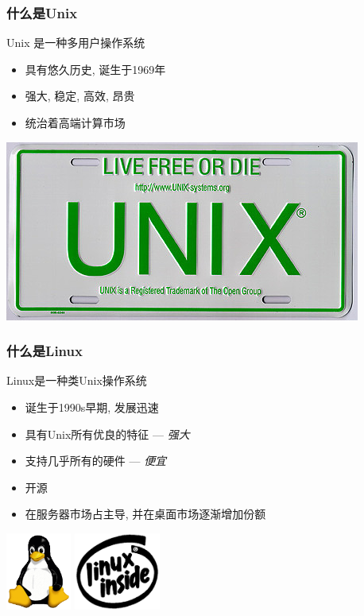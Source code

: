 \documentclass[compress]{beamer}
\begin{document}
\begin{frame}
\frametitle{什么是Unix}
\begin{block}{Unix 是一种多用户操作系统}
\begin{itemize}
    \item 具有悠久历史, 诞生于1969年
    \item 强大, 稳定, 高效, 昂贵
    \item 统治着高端计算市场
\end{itemize}
\end{block}
\begin{center}
 \centering\includegraphics[scale=0.7]{unix.jpg}
 \end{center}
\end{frame}

\begin{frame}
\frametitle{什么是Linux}
\begin{block}{Linux是一种类Unix操作系统}
\begin{itemize}
    \item 诞生于1990s早期, 发展迅速 
    \item 具有Unix所有优良的特征 --- \emph{强大}
    \item 支持几乎所有的硬件 --- \emph{便宜}
    \item 开源
    \item 在服务器市场占主导, 并在桌面市场逐渐增加份额
\end{itemize}
\end{block}

\hfill\includegraphics[height=1.0in]{Tux.png}\hfill%
\includegraphics[height=1.0in]{linux_inside.pdf}\hfill
\end{frame}
\end{document}
